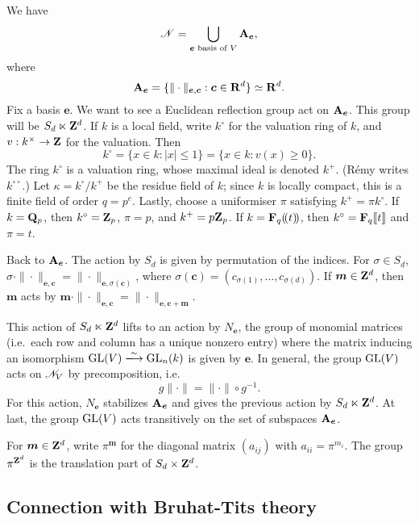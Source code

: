 \documentclass{article}
\begin{document}
We have 
\[
  \mathscr{N}=\bigcup_{\boldsymbol e\text{ basis of }V} \mathbf{A}_{\boldsymbol e} ,
\]
where 
\[
  \mathbf{A}_{\boldsymbol e} = \{\|\cdot\|_{\boldsymbol e,\boldsymbol c}:\boldsymbol c\in \mathbf{R}^d\} \simeq \mathbf{R}^d .
\]
Fix a basis $\boldsymbol e$. We want to see a Euclidean reflection group act on 
$\mathbf{A}_{\boldsymbol e}$. This group will be 
$S_d \ltimes \mathbf{Z}^d$. If $k$ is a local field, write 
$k^\circ$ for the valuation ring of $k$, and $v:k^\times \to \mathbf{Z}$ for the 
valuation. Then 
\[
  k^\circ = \{x\in k:|x|\leqslant 1\} = \{x\in k:v(x)\geqslant 0\} .
\]
The ring $k^\circ$ is a valuation ring, whose maximal ideal is denoted 
$k^+$. (R\'emy writes $k^{\circ\circ}$.) Let $\kappa=k^\circ/k^+$ be the residue 
field of $k$; since $k$ is locally compact, this is a finite field of order 
$q=p^e$. Lastly, choose a uniformiser $\pi$ satisfying $k^+=\pi k^\circ$. If 
$k=\mathbf{Q}_p$, then $k^\circ=\mathbf{Z}_p$, $\pi=p$, and $k^+=p \mathbf{Z}_p$. If 
$k=\mathbf{F}_q(\! ( t )\! )$, then $k^\circ=\mathbf{F}_q\llbracket t\rrbracket$ and 
$\pi=t$. 

Back to $\mathbf{A}_{\boldsymbol e}$. The action by $S_d$ is given by permutation of 
the indices. For $\sigma\in S_d$, 
$\sigma\cdot \|\cdot\|_{\boldsymbol e,\boldsymbol c} = \|\cdot\|_{\boldsymbol e, \sigma(\boldsymbol c)}$, 
where $\sigma(\boldsymbol c) = (c_{\sigma(1)},\dots,c_{\sigma(d)})$. 
If $\boldsymbol m\in \mathbf{Z}^d$, then $\boldsymbol m$ acts by 
$\boldsymbol m \cdot \|\cdot\|_{\boldsymbol e,\boldsymbol c} = \|\cdot\|_{\boldsymbol e,\boldsymbol c+\boldsymbol m}$.

This action of $S_d\ltimes \mathbf{Z}^d$ lifts to an action by 
$N_{\boldsymbol e}$, the group of monomial matrices (i.e.\ each row and 
column has a unique nonzero entry) where the matrix inducing an isomorphism 
$\generallinear(V)\isomorphism \generallinear_n(k)$ is given by 
$\boldsymbol e$. In general, the group $\operatorname{GL}(V)$ acts on 
$\mathscr{N}_V$ by precomposition, i.e. 
\[
  g \|\cdot\| = \|\cdot \|\circ g^{-1} .
\]
For this action, $N_{\boldsymbol e}$ stabilizes $\mathbf{A}_{\boldsymbol e}$ and 
gives the previous action by $S_d\ltimes \mathbf{Z}^d$. 
At last, the group $\operatorname{GL}(V)$ acts transitively on the set of 
subspaces $\mathbf{A}_{\boldsymbol e}$. 

For $\boldsymbol m\in \mathbf{Z}^d$, write $\pi^{\boldsymbol m}$ for the diagonal matrix 
$(a_{i j})$ with $a_{i i} = \pi^{m_i}$. The group 
$\pi^{\mathbf{Z}^d}$ is the translation part of $S_d\times \mathbf{Z}^d$. 


\subsection{Connection with Bruhat-Tits theory}
\end{document}
